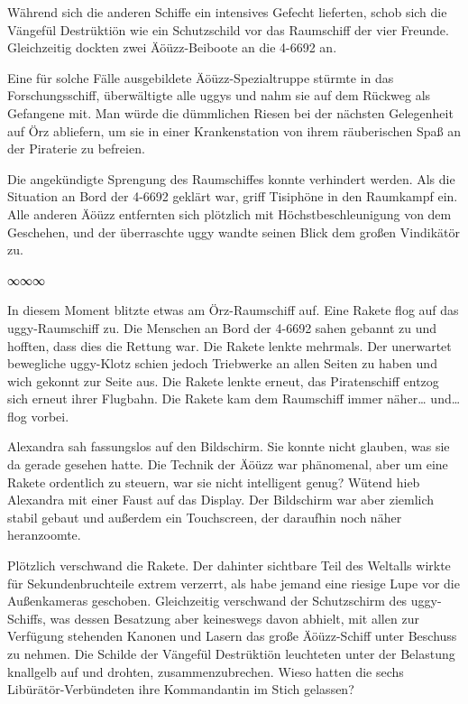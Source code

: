 Während sich die anderen Schiffe ein intensives Gefecht lieferten, schob sich die Vängefül Destrüktiön wie ein Schutzschild vor das Raumschiff der vier Freunde. Gleichzeitig dockten zwei Äöüzz-Beiboote an die 4-6692 an.

Eine für solche Fälle ausgebildete Äöüzz-Spezialtruppe stürmte in das Forschungsschiff, überwältigte alle uggys und nahm sie auf dem Rückweg als Gefangene mit. Man würde die dümmlichen Riesen bei der nächsten Gelegenheit auf Örz abliefern, um sie in einer Krankenstation von ihrem räuberischen Spaß an der Piraterie zu befreien.

Die angekündigte Sprengung des Raumschiffes konnte verhindert werden. Als die Situation an Bord der 4-6692 geklärt war, griff Tisiphöne in den Raumkampf ein. Alle anderen Äöüzz entfernten sich plötzlich mit Höchstbeschleunigung von dem Geschehen, und der überraschte uggy wandte seinen Blick dem großen Vindikätör zu.

\begin{center}
    ∞∞∞
\end{center}

In diesem Moment blitzte etwas am Örz-Raumschiff auf. Eine Rakete flog auf das uggy-Raumschiff zu. Die Menschen an Bord der 4-6692 sahen gebannt zu und hofften, dass dies die Rettung war. Die Rakete lenkte mehrmals. Der unerwartet bewegliche uggy-Klotz schien jedoch Triebwerke an allen Seiten zu haben und wich gekonnt zur Seite aus. Die Rakete lenkte erneut, das Piratenschiff entzog sich erneut ihrer Flugbahn. Die Rakete kam dem Raumschiff immer näher… und… flog vorbei.

Alexandra sah fassungslos auf den Bildschirm. Sie konnte nicht glauben, was sie da gerade gesehen hatte. Die Technik der Äöüzz war phänomenal, aber um eine Rakete ordentlich zu steuern, war sie nicht intelligent genug? Wütend hieb Alexandra mit einer Faust auf das Display. Der Bildschirm war aber ziemlich stabil gebaut und außerdem ein Touchscreen, der daraufhin noch näher heranzoomte.

Plötzlich verschwand die Rakete. Der dahinter sichtbare Teil des Weltalls wirkte für Sekundenbruchteile extrem verzerrt, als habe jemand eine riesige Lupe vor die Außenkameras geschoben. Gleichzeitig verschwand der Schutzschirm des uggy-Schiffs, was dessen Besatzung aber keineswegs davon abhielt, mit allen zur Verfügung stehenden Kanonen und Lasern das große Äöüzz-Schiff unter Beschuss zu nehmen. Die Schilde der Vängefül Destrüktiön leuchteten unter der Belastung knallgelb auf und drohten, zusammenzubrechen. Wieso hatten die sechs Libürätör-Verbündeten ihre Kommandantin im Stich gelassen?

